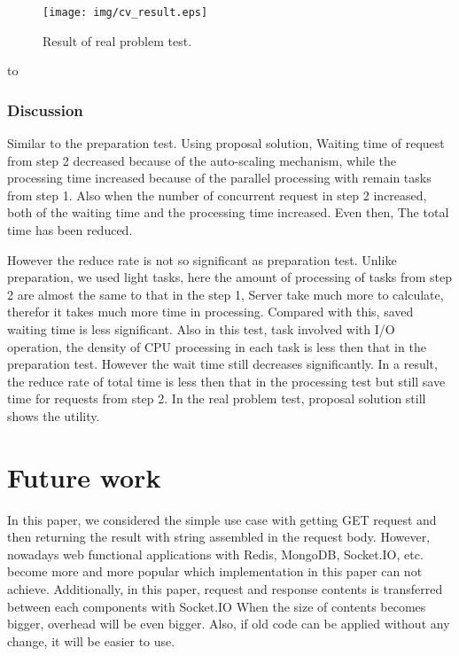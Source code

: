 \documentclass[JIP]{ipsj}
\begin{document}
\begin{figure}[tb]
	\texttt{[image: img/cv\_result.eps]}
	\caption{Result of real problem test.} 
	\label{fig:result_real} 
\end{figure}

\begin{table}[tb]
\caption{The reduce rate of proposal solution compare with recent solution.}
\label{tab:reduce_rate_cv}
	\hbox to
\end{table}

\subsubsection{Discussion}
Similar to the preparation test. Using proposal solution, Waiting time of request from step 2 decreased because of the auto-scaling mechanism, while the processing time increased because of the parallel processing with remain tasks from step 1. Also when the number of concurrent request in step 2 increased, both of the waiting time and the processing time increased. Even then, The total time has been reduced. 

However the reduce rate is not so significant as preparation test. 
Unlike preparation, we used light tasks, here the amount of processing of tasks from step 2 are almost the same to that in the step 1, Server take much more to calculate, therefor it takes much more time in processing. Compared with this, saved waiting time is less significant. Also in this test, task involved with I/O operation, the density of CPU processing in each task is less then that in the preparation test. However the wait time still decreases significantly. In a result, the reduce rate of total time is less then that in the processing test but still save time for requests from step 2.
In the real problem test, proposal solution still shows the utility.


\section{Future work}
In this paper, we considered the simple use case with getting GET request and then returning the result with string assembled in the request body. 
However, nowadays web functional applications with Redis, MongoDB, Socket.IO, etc. become more and more popular which implementation in this paper can not achieve.
Additionally, in this paper, request and response contents is transferred between each components with Socket.IO
When the size of contents becomes bigger, overhead will be even bigger.
Also, if old code can be applied without any change, it will be easier to use. 
\end{document}
